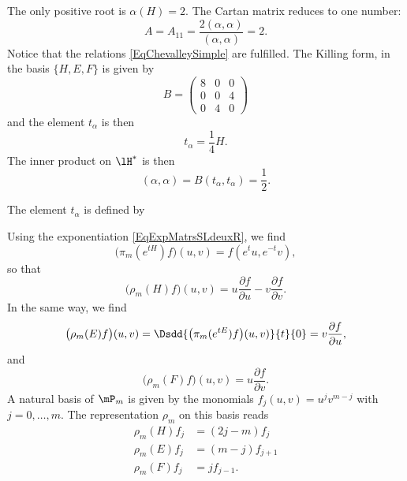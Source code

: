 The only positive root is \( \alpha(H)=2\). The Cartan matrix reduces to one number: 
\begin{equation}
    A=A_{11}=\frac{ 2(\alpha,\alpha) }{ (\alpha,\alpha) }=2.
\end{equation}
Notice that the relations \eqref{EqChevalleySimple} are fulfilled. The Killing form, in the basis \( \{ H,E,F \}\) is given by
\begin{equation}
    B=\begin{pmatrix}
        8    &   0    &   0    \\
        0    &   0    &   4    \\
        0    &   4    &   0
    \end{pmatrix}
\end{equation}
and the element \( t_{\alpha}\) is then
\begin{equation}
    t_{\alpha}=\frac{1}{ 4 }H.
\end{equation}
The inner product on \( \lH^*\) is then
\begin{equation}        \label{Eqinnerhstarsldc}
    (\alpha,\alpha)=B(t_{\alpha},t_{\alpha})=\frac{ 1 }{2}.
\end{equation}

The element \( t_{\alpha}\) is defined by 

Using the exponentiation \eqref{EqExpMatrsSLdeuxR}, we find
\[ 
	\big( \pi_m( e^{tH})f \big)(u,v)=f( e^{t}u, e^{-t}v),
\]
so that
\begin{equation}
	\big( \rho_m(H)f \big)(u,v)=u\frac{ \partial f }{ \partial u }-v\frac{ \partial f }{ \partial v }.
\end{equation}
In the same way, we find
\begin{equation}
	\big( \rho_m(E)f \big)(u,v)=\Dsdd{ \big( \pi_m( e^{tE})f \big)(u,v) }{t}{0}=v\frac{ \partial f }{ \partial u },
\end{equation}
and
\begin{equation}
	 \big( \rho_m(F)f \big)(u,v)=u \frac{ \partial f }{ \partial v }.
\end{equation}
A natural basis of $\mP_m$ is given by the monomials $f_j(u,v)=u^jv^{m-j}$ with $j=0,\ldots,m$. The representation $\rho_m$ on this basis reads
\begin{equation}        \label{EqReprezgsldeuxC}
\begin{split}
	\rho_m(H)f_j&=(2j-m)f_j\\
    \rho_m(E)f_j&=(m-j)f_{j+1}\\
    \rho_m(F)f_j&=jf_{j-1}.
\end{split}
\end{equation}

